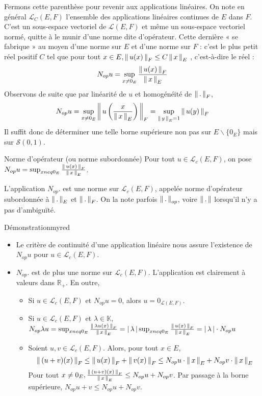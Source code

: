     Fermons cette parenthèse pour revenir aux applications linéaires. On note en général $\mathcal{L}_C(E,F)$ l’ensemble des applications linéaires continues de $E$ dans $F$. C’est un sous-espace vectoriel de $\mathcal{L}(E,F)$ et même un sous-espace vectoriel normé, quitte à le munir d’une norme dite d’opérateur. Cette dernière « se fabrique » au moyen d’une norme sur $E$ et d’une norme sur $F$ : c’est le plus petit réel positif $C$ tel que pour tout $x \in E, \left\lVert \,u(x) \, \right\rVert_F \leq C \left\lVert \,x \, \right\rVert_E$ , c’est-à-dire le réel :
    \[ N_{op}{u} = \sup_{x \neq 0_E} \frac{\left\lVert \,u(x) \, \right\rVert_F}{\left\lVert \,x \, \right\rVert_E} \]
    Observons de suite que par linéarité de $u$ et homogénéité de $\left\lVert \,. \, \right\rVert_F$, 
    \[ N_{op}{u} = \sup_{x \neq 0_E} \left\lVert \,u\left(\frac{x}{\left\lVert \,x \, \right\rVert_E}\right) \, \right\rVert_F = \sup_{\left\lVert \,y \, \right\rVert_E = 1} \left\lVert \,u(y) \, \right\rVert_F \] 
    Il suffit donc de déterminer une telle borne supérieure non pas sur $E \backslash \{ 0_E \}$ mais sur $\mathcal{S}(0,1)$.

    \begin{theo}{Norme d’opérateur (ou norme subordonnée)}
        Pour tout $u \in \mathcal{L}_c(E,F)$, on pose $N_{op}{u} = \sup_{x neq 0_E} \frac{\left\lVert \,u(x) \, \right\rVert_F}{\left\lVert \,x \, \right\rVert_E}$. 

        L’application $N_{op}{.}$ est une norme sur $\mathcal{L}_c(E,F)$, appelée norme d’opérateur subordonnée à $\left\lVert \,. \, \right\rVert_E$ et $\left\lVert \,. \, \right\rVert_F$. On la note parfois $\left\lVert \,. \, \right\rVert_{op}$, voire $\left\lVert \,. \, \right\rVert$ lorsqu’il n’y a pas d’ambiguïté.
    \end{theo}

    \begin{demo}{Démonstration}{myred}
        \begin{itemize}
            \item Le critère de continuité d’une application linéaire nous assure l’existence de $N_{op}{u}$ pour $u \in \mathcal{L}_c(E,F)$.
            \item $N_{op}{.}$ est de plus une norme sur $\mathcal{L}_c(E,F)$. L’application est clairement à valeurs dans $\mathbb{R}_+$. En outre, 
            \begin{itemize}
                \item Si $u \in \mathcal{L}_c(E,F)$ et $N_{op}{u} = 0$, alors $u = 0_{\mathcal{L}(E,F)}$.
                \item Si $u \in \mathcal{L}_c(E,F)$ et $\lambda \in \mathbb{K}$, $N_{op}{\lambda u} = \sup_{x neq 0_E} \frac{\left\lVert \,\lambda u(x) \, \right\rVert_F}{\left\lVert \,x \, \right\rVert_E} = \left\lvert \,\lambda \, \right\rvert \sup_{x neq 0_E} \frac{\left\lVert \,u(x) \, \right\rVert_F}{\left\lVert \,x \, \right\rVert_E} = \left\lvert \,\lambda \, \right\rvert \cdot N_{op}{u}$
                \item Soient $u,v \in \mathcal{L}_c(E,F)$. Alors, pour tout $x \in E$, 
                \[ \left\lVert \,(u+v)(x) \, \right\rVert_F \leq \left\lVert \,u(x) \, \right\rVert_F + \left\lVert \,v(x) \, \right\rVert_F \leq N_{op}{u} \cdot \left\lVert \,x \, \right\rVert_E + N_{op}{v} \cdot \left\lVert \,x \, \right\rVert_E \] 
                Pour tout $x \neq 0_E, \frac{\left\lVert \,(u+v)(x) \, \right\rVert_F}{\left\lVert \,x \, \right\rVert_E} \leq N_{op}{u} + N_{op}{v}$. Par passage à la borne supérieure, $N_{op}{u+v} \leq N_{op}{u} + N_{op}{v}$.
            \end{itemize}
        \end{itemize}
    \end{demo}

